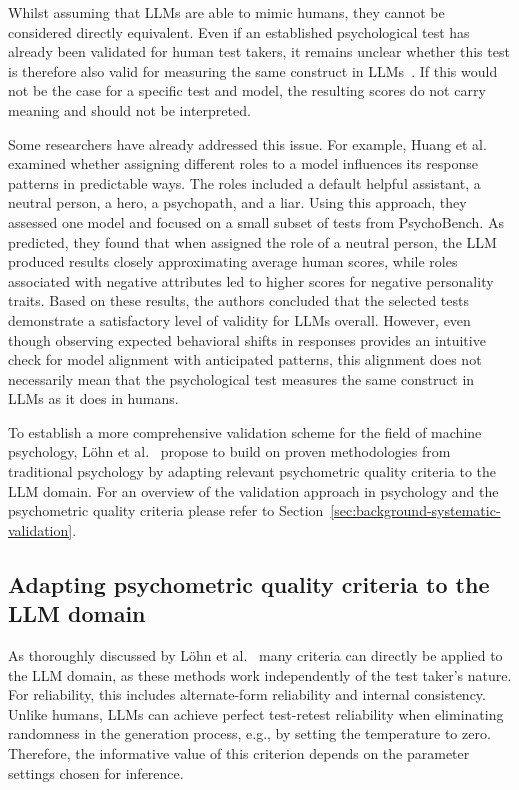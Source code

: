 \documentclass{DESSThesis}
\begin{document}
Whilst assuming that LLMs are able to mimic humans, they cannot be considered directly equivalent. Even if an established psychological test has already been validated for human test takers, it remains unclear whether this test is therefore also valid for measuring the same construct in LLMs~\cite{lohn_is_2024}. If this would not be the case for a specific test and model, the resulting scores do not carry meaning and should not be interpreted. 

Some researchers have already addressed this issue. For example, Huang et al.~\cite{huang_humanity_2023} examined whether assigning different roles to a model influences its response patterns in predictable ways. The roles included a default helpful assistant, a neutral person, a hero, a psychopath, and a liar. Using this approach, they assessed one model and focused on a small subset of tests from PsychoBench. As predicted, they found that when assigned the role of a neutral person, the LLM produced results closely approximating average human scores, while roles associated with negative attributes led to higher scores for negative personality traits. Based on these results, the authors concluded that the selected tests demonstrate a satisfactory level of validity for LLMs overall. However, even though observing expected behavioral shifts in responses provides an intuitive check for model alignment with anticipated patterns, this alignment does not necessarily mean that the psychological test measures the same construct in LLMs as it does in humans.

To establish a more comprehensive validation scheme for the field of machine psychology, Löhn et al.~\cite{lohn_is_2024} propose to build on proven methodologies from traditional psychology by adapting relevant psychometric quality criteria to the LLM domain. For an overview of the validation approach in psychology and the psychometric quality criteria please refer to Section~\ref{sec:background-systematic-validation}. 

\subsection{Adapting psychometric quality criteria to the LLM domain}
\label{sec:related-work-machine-psychology-standards}

As thoroughly discussed by Löhn et al.~\cite{lohn_is_2024} many criteria can directly be applied to the LLM domain, as these methods work independently of the test taker's nature. For reliability, this includes alternate-form reliability and internal consistency. Unlike humans, LLMs can achieve perfect test-retest reliability when eliminating randomness in the generation process, e.g., by setting the temperature to zero. Therefore, the informative value of this criterion depends on the parameter settings chosen for inference. 
\end{document}
